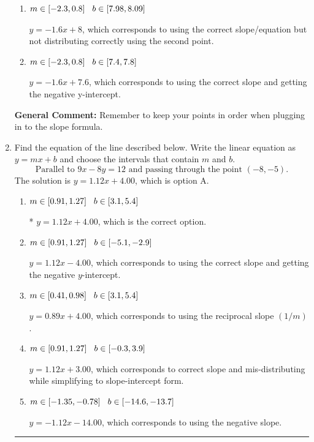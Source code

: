 \documentclass{extbook}[14pt]
\newcommand{\litem}[1]{\item #1

\rule{\textwidth}{0.4pt}}
\begin{document}
\begin{enumerate}
{\begin{enumerate}[label=\Alph*.]
* $y = -1.6x -7.6$, which is the correct option.
\item \( m \in [-2.3, 0.8] \hspace*{3mm} b \in [7.98, 8.09] \)

 $y = -1.6x + 8$, which corresponds to using the correct slope/equation but not distributing correctly using the second point.
\item \( m \in [-2.3, 0.8] \hspace*{3mm} b \in [7.4, 7.8] \)

 $y = -1.6x + 7.6$, which corresponds to using the correct slope and getting the negative y-intercept.
\end{enumerate}

\textbf{General Comment:} Remember to keep your points in order when plugging in to the slope formula.
}
\litem{
Find the equation of the line described below. Write the linear equation as $ y=mx+b $ and choose the intervals that contain $m$ and $b$.
\[ \text{Parallel to } 9 x - 8 y = 12 \text{ and passing through the point } (-8, -5). \]The solution is \( y = 1.12x + 4.00 \), which is option A.\begin{enumerate}[label=\Alph*.]
\item \( m \in [0.91, 1.27] \hspace*{3mm} b \in [3.1, 5.4] \)

* $y = 1.12x + 4.00$, which is the correct option.
\item \( m \in [0.91, 1.27] \hspace*{3mm} b \in [-5.1, -2.9] \)

 $y = 1.12x - 4.00$, which corresponds to using the correct slope and getting the negative $y$-intercept.
\item \( m \in [0.41, 0.98] \hspace*{3mm} b \in [3.1, 5.4] \)

 $y = 0.89x + 4.00$, which corresponds to using the reciprocal slope $(1/m)$.
\item \( m \in [0.91, 1.27] \hspace*{3mm} b \in [-0.3, 3.9] \)

 $y = 1.12x + 3.00$, which corresponds to correct slope and mis-distributing while simplifying to slope-intercept form.
\item \( m \in [-1.35, -0.78] \hspace*{3mm} b \in [-14.6, -13.7] \)

 $y = -1.12x - 14.00$, which corresponds to using the negative slope.
\end{enumerate}

}
\end{enumerate}
\end{document}
